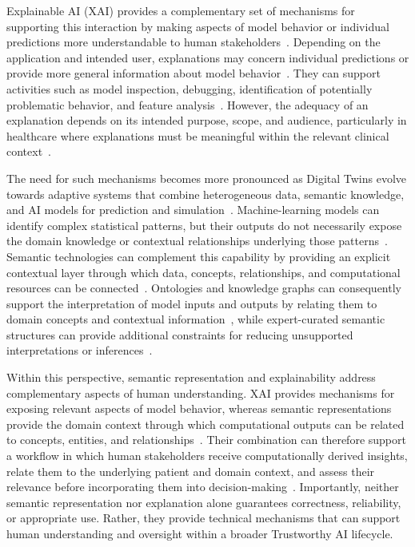 Explainable AI (XAI) provides a complementary set of mechanisms for supporting this interaction by making aspects of model behavior or individual predictions more understandable to human stakeholders~\cite{guidotti_survey_2019,miller_explanation_2019}. Depending on the application and intended user, explanations may concern individual predictions or provide more general information about model behavior~\cite{murdoch_interpretable_2019,xhani_role_2025,kaur_trustworthy_2022}. They can support activities such as model inspection, debugging, identification of potentially problematic behavior, and feature analysis~\cite{10.1145/2939672.2939778_ribeiro}. However, the adequacy of an explanation depends on its intended purpose, scope, and audience, particularly in healthcare where explanations must be meaningful within the relevant clinical context~\cite{kaur_trustworthy_2022}.

The need for such mechanisms becomes more pronounced as Digital Twins evolve towards adaptive systems that combine heterogeneous data, semantic knowledge, and AI models for prediction and simulation~\cite{felicetti_knowledge_2025}. Machine-learning models can identify complex statistical patterns, but their outputs do not necessarily expose the domain knowledge or contextual relationships underlying those patterns~\cite{felicetti_knowledge_2025}. Semantic technologies can complement this capability by providing an explicit contextual layer through which data, concepts, relationships, and computational resources can be connected~\cite{boje_towards_2020,albers_semantic_2020}. Ontologies and knowledge graphs can consequently support the interpretation of model inputs and outputs by relating them to domain concepts and contextual information~\cite{xhani_role_2025}, while expert-curated semantic structures can provide additional constraints for reducing unsupported interpretations or inferences~\cite{karabulut_ontologies_2024}.

Within this perspective, semantic representation and explainability address complementary aspects of human understanding. XAI provides mechanisms for exposing relevant aspects of model behavior, whereas semantic representations provide the domain context through which computational outputs can be related to concepts, entities, and relationships~\cite{xhani_role_2025,corbucci_semantic_2023,panigutti_role_2023}. Their combination can therefore support a workflow in which human stakeholders receive computationally derived insights, relate them to the underlying patient and domain context, and assess their relevance before incorporating them into decision-making~\cite{felicetti_knowledge_2025}. Importantly, neither semantic representation nor explanation alone guarantees correctness, reliability, or appropriate use. Rather, they provide technical mechanisms that can support human understanding and oversight within a broader Trustworthy AI lifecycle.

